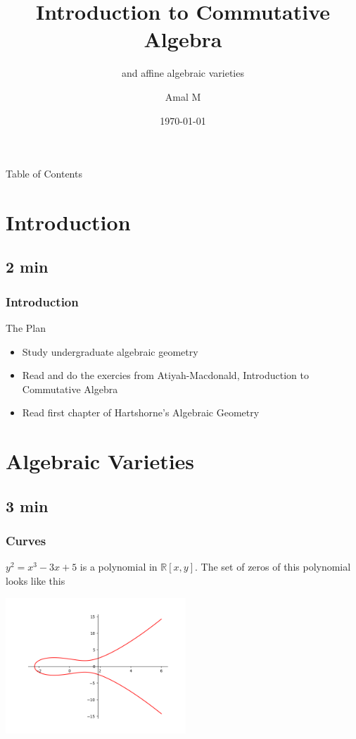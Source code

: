 \documentclass[pdf]{beamer}
\title{Introduction to Commutative Algebra}
\subtitle{and affine algebraic varieties}
\author{Amal M}
\date{\today}
\begin{document}

\begin{frame}
    \thispagestyle{empty}
    \titlepage
\end{frame}
\addtocounter{framenumber}{-1}

\begin{frame}{Table of Contents}
    \tableofcontents
\end{frame}


\section{Introduction}
\subsection{2 min}


\begin{frame}
    \frametitle{Introduction}
    The Plan
    \begin{itemize}
        \item Study undergraduate algebraic geometry 
        \item Read and do the exercies from Atiyah-Macdonald, Introduction to Commutative Algebra
        \item Read first chapter of Hartshorne's Algebraic Geometry
    \end{itemize}
\end{frame}


\section{Algebraic Varieties}
\subsection{3 min}

\begin{frame}
    \frametitle{Curves}
    $y^2 = x^3 − 3x + 5$ is a polynomial in $\mathbb{R}[x,y]$. The set of zeros of this polynomial looks like this
    \begin{center}
        \includegraphics[height=2in]{ell_curv1.png}
    \end{center}
\end{frame}
\end{document}
